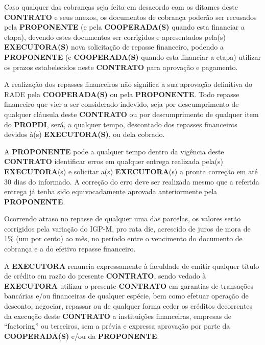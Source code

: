 \xx Caso qualquer das cobranças seja feita em desacordo com os ditames deste \textbf{CONTRATO} e seus anexos, os documentos de cobrança poderão ser recusados pela \textbf{PROPONENTE} (e pela \textbf{COOPERADA(S)} quando esta financiar a etapa), devendo estes documentos ser corrigidos e apresentados pela(s) \textbf{EXECUTORA(S)} nova solicitação de repasse financeiro, podendo a \textbf{PROPONENTE} (e \textbf{COOPERADA(S)} quando esta financiar a etapa) utilizar os prazos estabelecidos neste \textbf{CONTRATO} para aprovação e pagamento.

\xx A realização dos repasses financeiros não significa a sua aprovação definitiva do RADE pela \textbf{COOPERADA(S)} ou pela \textbf{PROPONENTE}. Todo repasse financeiro que vier a ser considerado indevido, seja por descumprimento de qualquer cláusula deste \textbf{CONTRATO} ou por descumprimento de qualquer item do \textbf{PROPDI}, será, a qualquer tempo, descontado dos repasses financeiros devidos à(s) \textbf{EXECUTORA(S)}, ou dela cobrado.

\xxx A \textbf{PROPONENTE} pode a qualquer tempo dentro da vigência deste \textbf{CONTRATO} identificar erros em qualquer entrega realizada pela(s) \textbf{EXECUTORA}(s) e solicitar a(s) \textbf{EXECUTORA}(s) a pronta correção em até 30 dias do informado. A correção do erro deve ser realizada mesmo que a referida entrega já tenha sido equivocadamente aprovada anteriormente pela \textbf{PROPONENTE}.

\xx Ocorrendo atraso no repasse de qualquer uma das parcelas, os valores serão corrigidos pela variação do IGP-M, pro rata die, acrescido de juros de mora de 1\% (um por cento) ao mês, no período entre o vencimento do documento de cobrança e a do efetivo repasse financeiro.

\xx A \textbf{EXECUTORA} renuncia expressamente à faculdade de emitir qualquer título de crédito em razão do presente \textbf{CONTRATO}, sendo vedado à \textbf{EXECUTORA} utilizar o presente \textbf{CONTRATO} em garantias de transações bancárias e/ou financeiras de qualquer espécie, bem como efetuar operação de desconto, negociar, repassar ou de qualquer forma ceder os créditos decorrentes da execução deste \textbf{CONTRATO} a instituições financeiras, empresas de “factoring” ou terceiros, sem a prévia e expressa aprovação por parte da \textbf{COOPERADA(S)} e/ou da \textbf{PROPONENTE}.
